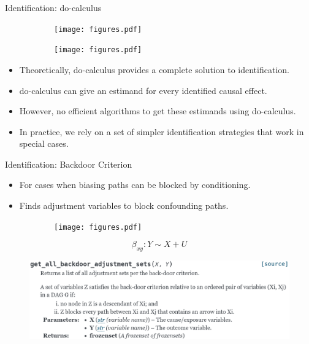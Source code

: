 \documentclass[aspectratio=169]{beamer}
\begin{document}
\begin{frame}{Identification: do-calculus}
	\begin{figure}
		\begin{subfigure}{0.5 \textwidth}
			\centering
			\texttt{[image: figures.pdf]}
		\end{subfigure}%
		\begin{subfigure}{0.5 \textwidth}
			\centering
			\texttt{[image: figures.pdf]}
		\end{subfigure}
		\label{fig:idnent}
	\end{figure}

	\begin{itemize}
		\item Theoretically, do-calculus provides a complete solution to identification.
		\item do-calculus can give an estimand for every identified causal effect.
		\item However, no efficient algorithms to get these estimands using do-calculus.
		\item In practice, we rely on a set of simpler identification strategies that work in special cases.
	\end{itemize}
\end{frame}

\begin{frame}{Identification: Backdoor Criterion}
	\begin{itemize}
		\item For cases when biasing paths can be blocked by conditioning.
		\item Finds adjustment variables to block confounding paths.
	\end{itemize}
	\begin{figure}
		\begin{subfigure}{0.5\textwidth}
			\centering
			\texttt{[image: figures.pdf]}
		\end{subfigure}%
		\begin{subfigure}{0.5 \textwidth}
			\begin{equation*}
				\beta_{xy}: Y \sim X + U
			\end{equation*}
		\end{subfigure}
	\end{figure}

	\begin{figure}
		\centering
		\includegraphics[scale=0.25]{imgs/backdoor.png}
	\end{figure}

\end{frame}
\end{document}
